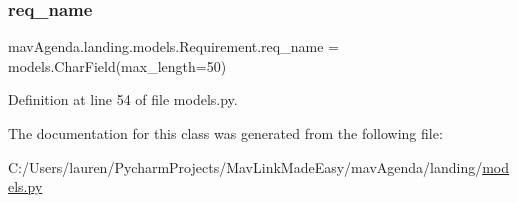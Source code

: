 \subsubsection{\texorpdfstring{req\+\_\+name}{req\_name}}
{\footnotesize\ttfamily mav\+Agenda.\+landing.\+models.\+Requirement.\+req\+\_\+name = models.\+Char\+Field(max\+\_\+length=50)\hspace{0.3cm}{\ttfamily [static]}}



Definition at line 54 of file models.\+py.



The documentation for this class was generated from the following file\+:\begin{DoxyCompactItemize}
\item 
C\+:/\+Users/lauren/\+Pycharm\+Projects/\+Mav\+Link\+Made\+Easy/mav\+Agenda/landing/\mbox{\hyperlink{models_8py}{models.\+py}}\end{DoxyCompactItemize}
